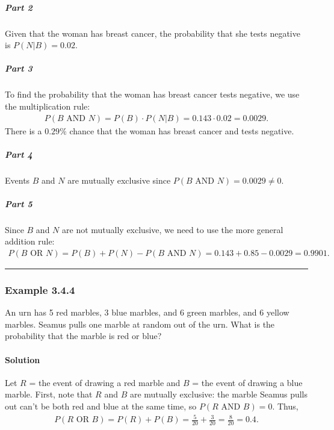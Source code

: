 \documentclass[letterpaper,10pt,english]{jupyterBook}
\begin{document}
\subparagraph{Part 2}
\label{\detokenize{Ch3 Probability/3.4 Addition Rules and Mutually Exclusive Events:id6}}
\sphinxAtStartPar
Given that the woman has breast cancer, the probability that she tests negative is \(P(N|B) = 0.02\).


\subparagraph{Part 3}
\label{\detokenize{Ch3 Probability/3.4 Addition Rules and Mutually Exclusive Events:id7}}
\sphinxAtStartPar
To find the probability that the woman has breast cancer  tests negative, we use the multiplication rule:
\begin{equation*}
\begin{split} P(B\text{ AND }N) = P(B) \cdot P(N|B) = 0.143 \cdot 0.02 = 0.0029. \end{split}
\end{equation*}
\sphinxAtStartPar
There is a \(0.29\%\) chance that the woman has breast cancer and tests negative.


\subparagraph{Part 4}
\label{\detokenize{Ch3 Probability/3.4 Addition Rules and Mutually Exclusive Events:id8}}
\sphinxAtStartPar
Events \(B\) and \(N\) are  mutually exclusive since \(P(B\text{ AND }N) = 0.0029 \neq 0\).


\subparagraph{Part 5}
\label{\detokenize{Ch3 Probability/3.4 Addition Rules and Mutually Exclusive Events:id9}}
\sphinxAtStartPar
Since \(B\) and \(N\) are not mutually exclusive, we need to use the more general addition rule:
\begin{equation*}
\begin{split} P(B\text{ OR }N) = P(B) + P(N) - P(B\text{ AND } N) = 0.143 + 0.85 - 0.0029 = 0.9901.\end{split}
\end{equation*}

\bigskip\hrule\bigskip



\subsubsection{Example 3.4.4}
\label{\detokenize{Ch3 Probability/3.4 Addition Rules and Mutually Exclusive Events:example-3-4-4}}
\sphinxAtStartPar
An urn has 5 red marbles, 3 blue marbles, and 6 green marbles, and 6 yellow marbles. Seamus pulls one marble at random out of the urn. What is the probability that the marble is red or blue?


\paragraph{Solution}
\label{\detokenize{Ch3 Probability/3.4 Addition Rules and Mutually Exclusive Events:id10}}
\sphinxAtStartPar
Let \(R\) = the event of drawing a red marble and \(B\) = the event of drawing a blue marble. First, note that \(R\) and \(B\) are mutually exclusive: the marble Seamus pulls out can’t be both red and blue at the same time, so \(P(R\text{ AND } B) = 0\). Thus,
\begin{equation*}
\begin{split}P(R\text{ OR } B) = P(R) + P(B) = \frac{5}{20} + \frac{3}{20} = \frac{8}{20} = 0.4. \end{split}
\end{equation*}
\end{document}
